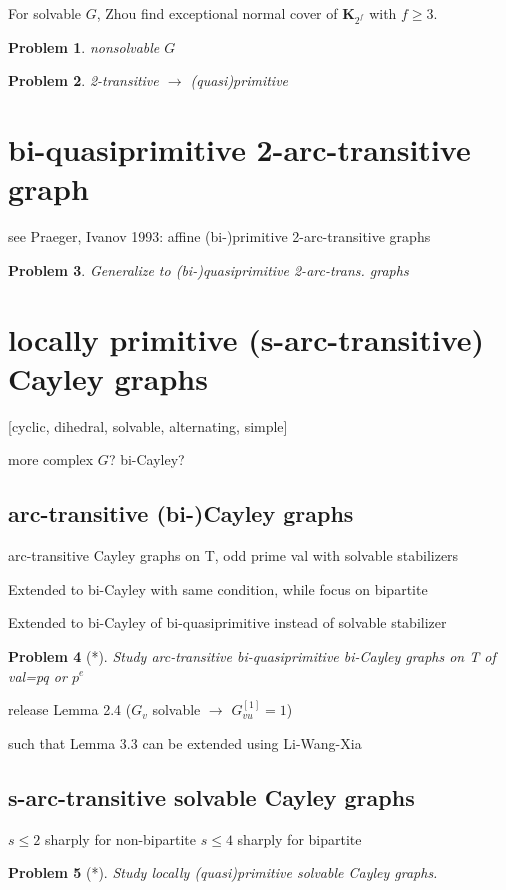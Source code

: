 \documentclass[a4,11pt]{article}
\newtheorem{problem}{Problem}[section]
\begin{document}
For solvable $G$, Zhou find exceptional normal cover of $\mathbf{K}_{2^f}$ with $f\geq 3$.

\begin{problem}
	nonsolvable $G$
\end{problem}

\begin{problem}
	2-transitive $\rightarrow$ (quasi)primitive
\end{problem}



\section{bi-quasiprimitive 2-arc-transitive graph}
see Praeger, Ivanov 1993: affine (bi-)primitive 2-arc-transitive graphs
\begin{problem}
	Generalize to (bi-)quasiprimitive 2-arc-trans. graphs
\end{problem}


\section{locally primitive (s-arc-transitive) Cayley graphs}
[cyclic, dihedral, solvable, alternating, simple] 

more complex $G$? bi-Cayley?

\subsection{arc-transitive (bi-)Cayley graphs}
arc-transitive Cayley graphs on T, odd prime val with solvable stabilizers

Extended to bi-Cayley with same condition, while focus on bipartite

Extended to bi-Cayley of bi-quasiprimitive instead of solvable stabilizer


\begin{problem}[*]
	Study arc-transitive bi-quasiprimitive bi-Cayley graphs on T of val=pq or $p^e$
\end{problem}

release Lemma 2.4 ($G_v$ solvable $\rightarrow$ $G_{vu}^{[1]}=1$)

such that Lemma 3.3 can be extended using Li-Wang-Xia


\subsection{s-arc-transitive solvable Cayley graphs}
$s\leq 2$ sharply for non-bipartite
$s\leq 4$ sharply for bipartite
\begin{problem}[*]
	Study locally (quasi)primitive solvable Cayley graphs.
\end{problem}
\end{document}
